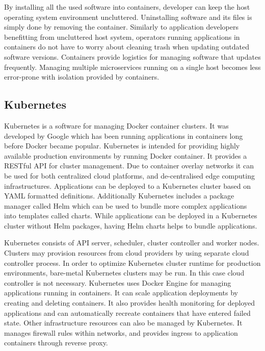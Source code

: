By installing all the used software into containers, developer can keep the
host operating system environment uncluttered. Uninstalling software and its
files is simply done by removing the container. Similarly to application
developers benefitting from uncluttered host system, operators running
applications in containers do not have to worry about cleaning trash when
updating outdated software versions. Containers provide logistics for managing
software that updates frequently. Managing multiple microservices running on a
single host becomes less error-prone with isolation provided by containers.

\subsection{Kubernetes}

Kubernetes \cite{burns2016borg} is a software for managing Docker container
clusters. It was developed by Google which has been running applications in
containers long before Docker became popular. Kubernetes is intended for
providing highly available production environments by running Docker container.
It provides a RESTful API for cluster management. Due to container overlay
networks it can be used for both centralized cloud platforms, and
de-centralised edge computing infrastructures. Applications can be deployed to
a Kubernetes cluster based on YAML formatted definitions. Additionally
Kubernetes includes a package manager called Helm  which can be used to bundle
more complex applications into templates called charts. While applications can
be deployed in a Kubernetes cluster without Helm packages, having Helm charts
helps to bundle applications.

Kubernetes consists of API server, scheduler, cluster controller and worker
nodes. Clusters may provision resources from cloud providers by using separate
cloud controller process. In order to optimize Kubernetes cluster runtime for
production environments, bare-metal Kubernetes clusters may be run. In this
case cloud controller is not necessary. Kubernetes uses Docker Engine for
managing applications running in containers. It can scale application
deployments by creating and deleting containers. It also provides health
monitoring for deployed applications and can automatically recreate containers
that have entered failed state. Other infrastructure resources can also be
managed by Kubernetes. It manages firewall rules within networks, and provides
ingress to application containers through reverse proxy.


